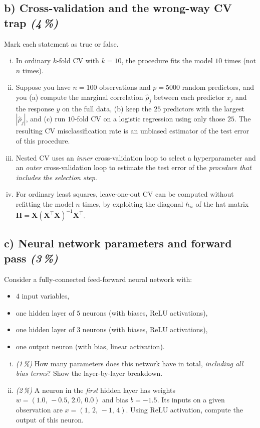 \documentclass[11pt,a4paper]{article}
\newcommand{\subpoints}[1]{\textit{(#1\,\%)}}
\begin{document}
\subsection*{b) Cross-validation and the wrong-way CV trap \subpoints{4}}
Mark each statement as true or false.
\begin{enumerate}[(i)]
  \item In ordinary $k$-fold CV with $k=10$, the procedure fits the model $10$ times (not $n$ times).
  \item Suppose you have $n = 100$ observations and $p = 5000$ random predictors, and you (a) compute the marginal correlation $\hat\rho_j$ between each predictor $x_j$ and the response $y$ on the full data, (b) keep the $25$ predictors with the largest $|\hat\rho_j|$, and (c) run $10$-fold CV on a logistic regression using only those $25$. The resulting CV misclassification rate is an unbiased estimator of the test error of this procedure.
  \item Nested CV uses an \emph{inner} cross-validation loop to select a hyperparameter and an \emph{outer} cross-validation loop to estimate the test error of the \emph{procedure that includes the selection step}.
  \item For ordinary least squares, leave-one-out CV can be computed without refitting the model $n$ times, by exploiting the diagonal $h_{ii}$ of the hat matrix $\mathbf H = \mathbf X(\mathbf X^\top \mathbf X)^{-1}\mathbf X^\top$.
\end{enumerate}

\subsection*{c) Neural network parameters and forward pass \subpoints{3}}
Consider a fully-connected feed-forward neural network with:
\begin{itemize}
  \item $4$ input variables,
  \item one hidden layer of $5$ neurons (with biases, ReLU activations),
  \item one hidden layer of $3$ neurons (with biases, ReLU activations),
  \item one output neuron (with bias, linear activation).
\end{itemize}

\begin{enumerate}[(i)]
  \item \subpoints{1} How many parameters does this network have in total, \emph{including all bias terms}? Show the layer-by-layer breakdown.
  \item \subpoints{2} A neuron in the \emph{first} hidden layer has weights $w = (1.0,\,-0.5,\,2.0,\,0.0)$ and bias $b = -1.5$. Its inputs on a given observation are $x = (1,\,2,\,-1,\,4)$. Using ReLU activation, compute the output of this neuron.
\end{enumerate}
\end{document}
